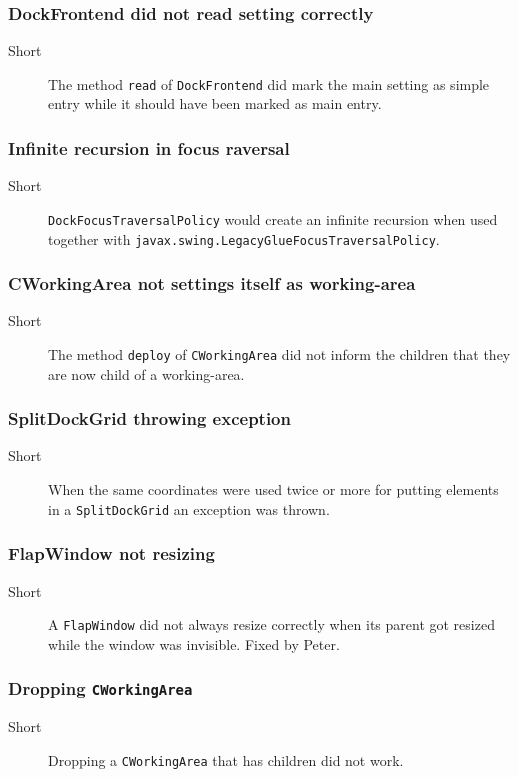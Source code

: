 \documentclass[a4paper,10pt]{article}
\newcommand{\src}[1]{\lstinline[basicstyle=\normalsize\ttfamily,keywordstyle=\normalsize\ttfamily,identifierstyle=\normalsize\ttfamily]|#1|}
\newcommand{\short}{\item[Short]}
\begin{document}
\subsubsection{DockFrontend did not read setting correctly}
\begin{description}
 \short The method \src{read} of \src{DockFrontend} did mark the main setting as simple entry while it should have been marked as main entry.
\end{description}

\subsubsection{Infinite recursion in focus raversal}
\begin{description}
 \short \src{DockFocusTraversalPolicy} would create an infinite recursion when used together with \src{javax.swing.LegacyGlueFocusTraversalPolicy}.
\end{description}

\subsubsection{CWorkingArea not settings itself as working-area}
\begin{description}
 \short The method \src{deploy} of \src{CWorkingArea} did not inform the children that they are now child of a working-area.
\end{description}

\subsubsection{SplitDockGrid throwing exception}
\begin{description}
 \short When the same coordinates were used twice or more for putting elements in a \src{SplitDockGrid} an exception was thrown.
\end{description}

\subsubsection{FlapWindow not resizing}
\begin{description}
 \short A \src{FlapWindow} did not always resize correctly when its parent got resized while the window was invisible. Fixed by Peter.
\end{description}

\subsubsection{Dropping \src{CWorkingArea}}
\begin{description}
 \short Dropping a \src{CWorkingArea} that has children did not work.
\end{description}
\end{document}
